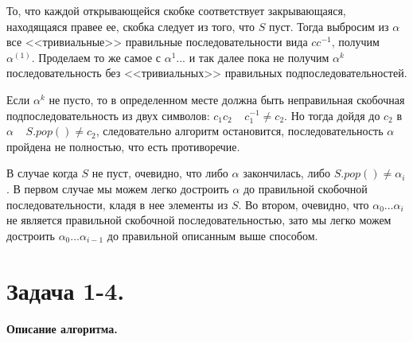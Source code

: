 \documentclass[12pt]{article}
\begin{document}
То, что каждой открывающейся скобке соответствует закрывающаяся, находящаяся правее ее, скобка следует
из того, что $ S $ пуст. Тогда выбросим из $ \alpha $ все <<тривиальные>> правильные последовательности вида
$cc^{-1}$, получим $ \alpha^{(1)} $. 
Проделаем то же самое с $ \alpha^{1} $... и так далее пока не получим
$ \alpha^{k} $ последовательность без <<тривиальных>> правильных подпоследовательностей. 

Если $ \alpha^{k} $ не пусто, то в определенном месте должна быть неправильная скобочная подпоследовательность из двух символов:
$ c_1c_2 \;\;\;\; c_1^{-1} \ne c_2 $. Но тогда дойдя до $ c_2 $ в $ \alpha \;\;\;\; S.pop() \ne c_2 $, следовательно
алгоритм остановится, последовательность $ \alpha $ пройдена не полностью, что есть противоречие.

В случае когда $ S $ не пуст, очевидно, что либо $ \alpha $ закончилась, либо $ S.pop() \ne \alpha_i $. В первом случае
мы можем легко достроить $ \alpha $ до правильной скобочной последовательности, кладя в нее элементы из $ S $. Во втором,
очевидно, что $ \alpha_0\dots \alpha_i $ не является правильной скобочной последовательностью, зато мы легко можем
достроить $ \alpha_0\dots \alpha_{i-1} $ до правильной описанным выше способом. 




\section{Задача 1-4.} 
\paragraph{Описание алгоритма.}
~

~

~

~

~

~

~

~

~

~

~

~

~

~

~

~

~

~

~

~

~
\end{document}
